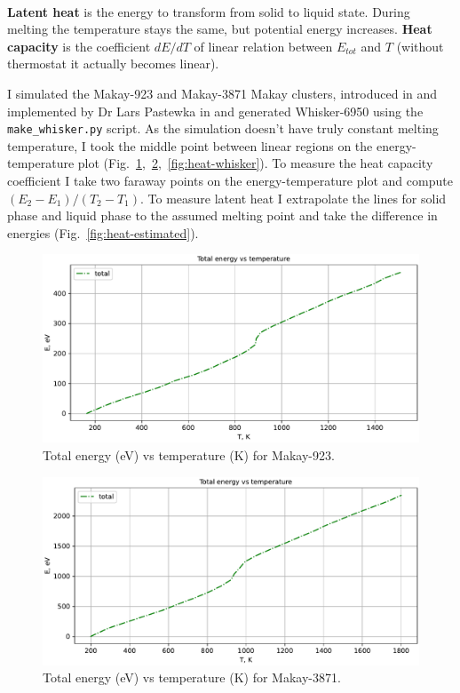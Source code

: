 \documentclass[12pt,a4paper]{article}
\newcommand{\framed}[1]{\tikz[baseline=(char.base)]{\node[shape=rectangle,draw,inner sep=4pt] (char) {#1};}}
\begin{document}
{\centering\framed{ \( \lambda = \sqrt{1 + \frac{Q}{E_k}} \) }\\}

{\bf Latent heat} is the energy to transform from solid to liquid state. During melting the temperature stays the same, but potential energy increases. {\bf Heat capacity} is the coefficient $dE/dT$ of linear relation between $E_{tot}$ and $T$ (without thermostat it actually becomes linear).

I simulated the Makay-923 and Makay-3871 Makay clusters, introduced in \cite{MakayOriginal} and implemented by Dr Lars Pastewka in \cite{MakayPastewka} and generated Whisker-6950 using the \verb|make_whisker.py| script.
As the simulation doesn't have truly constant melting temperature, I took the middle point between linear regions on the energy-temperature plot (Fig.~\ref{fig:heat-makay1},~\ref{fig:heat-makay2},~\ref{fig:heat-whisker}). To measure the heat capacity coefficient I take two faraway points on the energy-temperature plot and compute $(E_2-E_1)/(T_2-T_1)$. To measure latent heat I extrapolate the lines for solid phase and liquid phase to the assumed melting point and take the difference in energies (Fig.~\ref{fig:heat-estimated}).

\begin{figure}[h!]
	\centering
	\includegraphics[width=.8\linewidth]{img/milestone07-small.pdf}
	\caption{Total energy (eV) vs temperature (K) for Makay-923.}
	\label{fig:heat-makay1}
\end{figure}

\begin{figure}[h!]
	\centering
	\includegraphics[width=.95\linewidth]{img/milestone07-large.pdf}
	\caption{Total energy (eV) vs temperature (K) for Makay-3871.}
	\label{fig:heat-makay2}
\end{figure}
\end{document}
